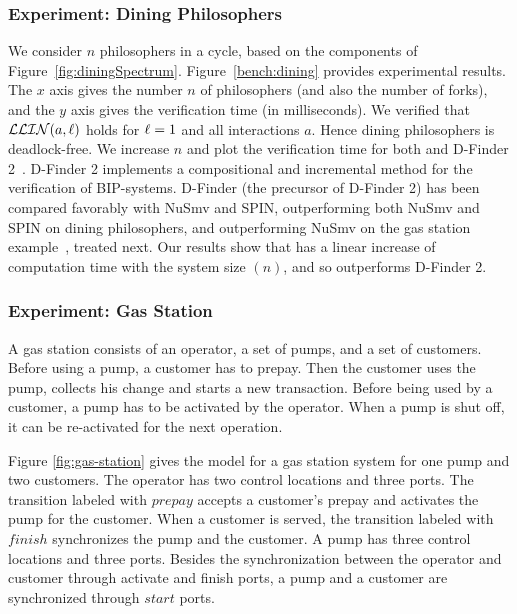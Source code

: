 \subsubsection{Experiment: Dining Philosophers} 
We consider $n$ philosophers in a cycle, based on the components of Figure~\ref{fig:diningSpectrum}.
Figure~\ref{bench:dining} provides experimental results.
The $x$ axis gives the number $n$ of philosophers (and also the number of forks), 
and the $y$ axis gives the verification time (in
milliseconds).  We verified that $\mathcal{LLIN}(a, \ell)$ holds for
$\ell = 1$ and all interactions $a$. Hence dining philosophers is deadlock-free.
%
We increase $n$ and plot the verification
time for both \ldfctool and D-Finder 2~\cite{DFinder2}.
D-Finder 2 implements a compositional and incremental method for the
verification of BIP-systems. D-Finder
(the precursor of D-Finder 2) has been compared favorably with NuSmv and
SPIN, outperforming both  NuSmv and SPIN on
dining philosophers, and outperforming NuSmv on the gas station
example~\cite{bensalem2010compositional}, treated next.
%
Our results show that \ldfctool has a linear increase of computation time with the system size
$(n)$, and so outperforms D-Finder 2.


\subsubsection{Experiment: Gas Station}
A gas station \cite{gasstation} consists of an operator, %
a set of pumps, and a set of customers. 
Before using a pump, a customer has to prepay. Then the customer uses the
pump, collects his change and %
starts a new transaction.
%
Before being used by a customer, a pump has to be activated by the
operator.  When a pump is shut off, it can be re-activated for the
next operation.  


Figure \ref{fig:gas-station} gives the model for a
gas station system for one pump and two customers.  The operator has
two control locations and three ports. The transition labeled with
$\mathit{prepay}$ accepts a customer's prepay and activates the pump for the
customer. When a customer is served, the transition labeled with
$\mathit{finish}$ synchronizes the pump and the customer.  A pump has three
control locations and three ports. Besides the synchronization between
the operator and customer through activate and finish ports, a pump
and a customer are synchronized through $\mathit{start}$ ports.

